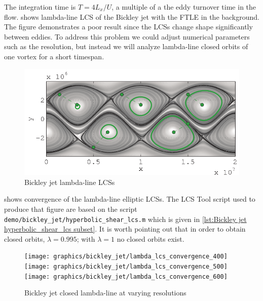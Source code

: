 \documentclass{article}
\begin{document}
The integration time is $T=4L_x/U$, a multiple of a the eddy turnover
time in the flow.  shows lambda-line LCS of the Bickley jet with the FTLE in the background. The figure demonstrates a poor result since the LCSs change shape significantly between eddies. To address this problem we could adjust numerical parameters such as the resolution, but instead we will analyze lambda-line closed orbits of one vortex for a short timespan.

\begin{figure}
\centering
\includegraphics[width=.85\textwidth]{graphics/bickley_jet/lambda_lcs_full}
\caption{Bickley jet lambda-line LCSs}
\label{fig:Bickley_jet_lambda_LCS_full}
\end{figure}

 shows convergence of the lambda-line elliptic LCSs. The LCS Tool script used to produce that figure are based on the script \lstinline!demo/bickley_jet/hyperbolic_shear_lcs.m! which is given in \cref{lst:Bickley jet hyperbolic_shear_lcs subset}. It is worth pointing out that in order to obtain closed orbits, $\lambda = 0.995$; with $\lambda = 1$ no closed orbits exist.



\begin{figure}[hbt]
\centering
\texttt{[image: graphics/bickley\_jet/lambda\_lcs\_convergence\_400]}
\texttt{[image: graphics/bickley\_jet/lambda\_lcs\_convergence\_500]}
\texttt{[image: graphics/bickley\_jet/lambda\_lcs\_convergence\_600]}
\caption{Bickley jet closed lambda-line at varying resolutions}
\label{fig:Bickley jet lambda lcs convergence}
\end{figure}
\end{document}
